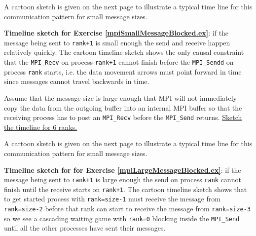 A cartoon sketch is given on the next page to illustrate a typical time line for this communication pattern for small  message sizes.

\newpage

\begin{Answer}
{\bf Timeline sketch for Exercise \ref{mpiSmallMessageBlocked.ex}}: if the message being sent to \texttt{rank+1} is small enough the send and receive happen relatively quickly. The cartoon timeline sketch
shows the only causal constraint that the \texttt{MPI\_Recv} on process \texttt{rank+1} cannot finish before the \texttt{MPI\_Sendd} on process \texttt{rank} starts, i.e. the data movement arrows must point forward in time since messages cannot travel backwards in time.
\end{Answer}



\begin{Exercise}
\label{mpiLargeMessageBlocked.ex}
Assume that the message size is large enough that MPI will not immediately copy the data from the outgoing buffer into an internal MPI buffer so that the receiving process has to post an \texttt{MPI\_Recv} before the \texttt{MPI\_Send} returns. \underline{Sketch the timeline for 6 ranks.}
\end{Exercise}

A cartoon sketch is given on the next page to illustrate a typical time line for this communication pattern for small  message sizes.

\newpage
\begin{Answer}
{\bf Timeline sketch for  for Exercise \ref{mpiLargeMessageBlocked.ex}}: if the message being sent to \texttt{rank+1} is large enough the send on process \texttt{rank} cannot finish until the receive starts on \texttt{rank+1}.  The cartoon timeline sketch
shows that to get started process with \texttt{rank=size-1} must receive the message from \texttt{rank=size-2} before that rank can start to receive the message from \texttt{rank=size-3} so we see a cascading waiting game with \texttt{rank=0} blocking inside the \texttt{MPI\_Send} until all the other processes have sent their messages. 
\end{Answer}


